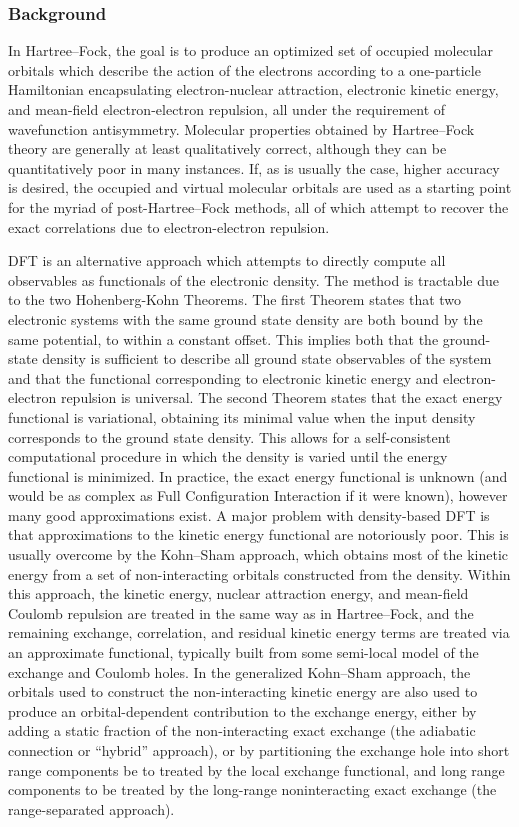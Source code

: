 \subsubsection{Background}

In Hartree--Fock, the goal is to produce an optimized set of occupied molecular
orbitals which describe the action of the electrons according to a one-particle
Hamiltonian encapsulating electron-nuclear attraction, electronic kinetic
energy, and mean-field electron-electron repulsion, all under the requirement of
wavefunction antisymmetry. Molecular properties obtained by Hartree--Fock theory
are generally at least qualitatively correct, although they can be
quantitatively poor in many instances. If, as is usually the case, higher
accuracy is desired, the occupied and virtual molecular orbitals are used as a
starting point for the myriad of post-Hartree--Fock methods, all of which attempt
to recover the exact correlations due to electron-electron repulsion.  

DFT is an alternative approach which attempts to directly compute all
observables as functionals of the electronic density. The method is tractable
due to the two Hohenberg-Kohn Theorems. The first Theorem states that two
electronic systems with the same ground state density are both bound by the same
potential, to within a constant offset. This implies both that the ground-state
density is sufficient to describe all ground state observables of the system and
that the functional corresponding to electronic kinetic energy and
electron-electron repulsion is universal. The second Theorem states that the
exact energy functional is variational, obtaining its minimal value when the
input density corresponds to the ground state density. This allows for a
self-consistent computational procedure in which the density is varied until the
energy functional is minimized. In practice, the exact energy functional is
unknown (and would be as complex as Full Configuration Interaction if it were
known), however many good approximations exist. A major problem with
density-based DFT is that approximations to the kinetic energy functional are
notoriously poor. This is usually overcome by the Kohn--Sham approach, which
obtains most of the kinetic energy from a set of non-interacting orbitals
constructed from the density. Within this approach, the kinetic energy,
nuclear attraction energy, and mean-field Coulomb repulsion are treated in the
same way as in Hartree--Fock, and the remaining exchange, correlation, and
residual kinetic energy terms are treated via an approximate functional,
typically built from some semi-local model of the exchange and Coulomb holes. In
the generalized Kohn--Sham approach, the orbitals used to construct the
non-interacting kinetic energy are also used to produce an orbital-dependent
contribution to the exchange energy, either by adding a static fraction of the
non-interacting exact exchange (the adiabatic connection or ``hybrid''
approach), or by partitioning the exchange hole into short range components be to
treated by the local exchange functional, and long range components to be
treated by the long-range noninteracting exact exchange (the range-separated
approach).

